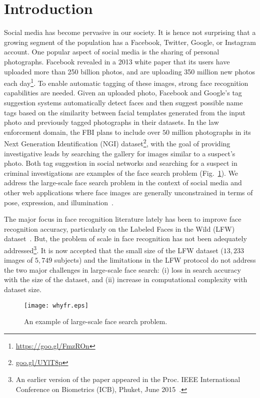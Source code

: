 \documentclass[10pt,journal,compsoc]{IEEEtran}
\begin{document}
\maketitle
\IEEEdisplaynontitleabstractindextext
\IEEEpeerreviewmaketitle

\section{Introduction}\label{sec:introduction}
Social media has become pervasive in our society. It is hence not surprising that a growing segment of the population has a Facebook, Twitter, Google, or Instagram account. One popular aspect of social media is the sharing of personal photographs. Facebook revealed in a 2013 white paper that its users have uploaded more than 250 billion photos, and are uploading 350 million new photos each day\footnote{\url{https://goo.gl/FmzROn}}. To enable automatic tagging of these images, strong face recognition capabilities are needed. Given an uploaded photo, Facebook and Google's tag suggestion systems automatically detect faces and then suggest possible name tags based on the similarity between facial templates generated from the input photo and previously tagged photographs in their datasets. In the law enforcement domain, the FBI plans to include over $50$ million photographs in its Next Generation Identification (NGI) dataset\footnote{\url{goo.gl/UYlT8p}}, with the goal of providing investigative leads by searching the gallery for images similar to a suspect's photo. Both tag suggestion in social networks and searching for a suspect in criminal investigations are examples of the face search problem (Fig.~\ref{fig:intro}). We address the large-scale face search problem in the context of social media and other web applications where face images are generally unconstrained in terms of pose, expression, and illumination~\cite{faceretrieval:chen2012, faceretrieval:wu2010}.

The major focus in face recognition literature lately has been to improve face recognition accuracy, particularly on the Labeled Faces in the Wild (LFW) dataset~\cite{DB:LFWTech}. But, the problem of scale in face recognition has not been adequately addressed\footnote{An earlier version of the paper appeared in the Proc. IEEE International Conference on Biometrics (ICB), Phuket, June 2015~\cite{icb2015}.}. It is now accepted that the small size of the LFW dataset ($13,233$ images of $5,749$ subjects) and the limitations in the LFW protocol do not address the two major challenges in large-scale face search:
(i) loss in search accuracy with the size of the dataset, and (ii) increase in computational complexity  with dataset size.
\begin{figure}
  \centering
  \texttt{[image: whyfr.eps]}\\
  \caption{An example of large-scale face search problem.}\label{fig:intro}
\end{figure}
\end{document}
